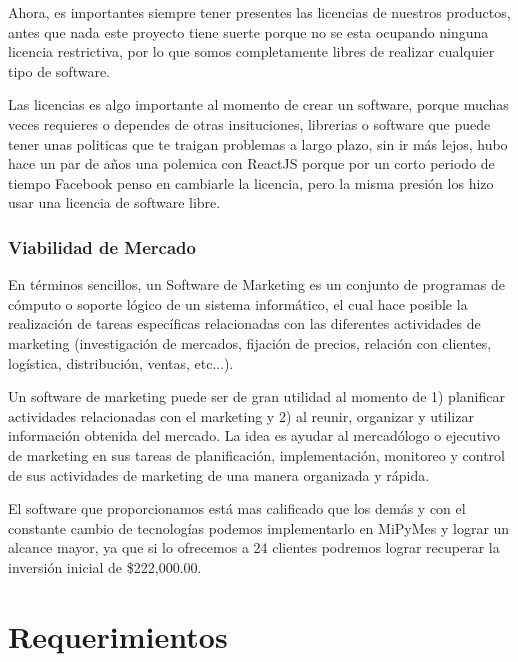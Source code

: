 \documentclass[12pt, fleqn]{report}                             %
\theoremstyle{break}                                            %
\begin{document}
        Ahora, es importantes siempre tener presentes las licencias de nuestros productos, antes que nada este 
        proyecto tiene suerte porque no se esta ocupando ninguna licencia restrictiva, por lo que somos
        completamente libres de realizar cualquier tipo de software.

        Las licencias es algo importante al momento de crear un software, porque muchas veces
        requieres o dependes de otras insituciones, librerias o software que puede tener unas politicas
        que te traigan problemas a largo plazo, sin ir más lejos, hubo hace un par de años una polemica con
        ReactJS porque por un corto periodo de tiempo Facebook penso en cambiarle la licencia, pero la misma
        presión los hizo usar una licencia de software libre.
    
    
    \vspace{1em}
    \subsection{Viabilidad de Mercado}

        En términos sencillos, un Software de Marketing es un conjunto de programas de cómputo o soporte lógico de un sistema informático, el cual hace posible la realización de tareas específicas relacionadas con las diferentes actividades de marketing (investigación de mercados, fijación de precios, relación con clientes, logística, distribución, ventas, etc...).

        Un software de marketing puede ser de gran utilidad al momento de 1) planificar actividades relacionadas con el marketing y 2) al reunir, organizar y utilizar información obtenida del mercado. La idea es ayudar al mercadólogo o ejecutivo de marketing en sus tareas de planificación, implementación, monitoreo y control de sus actividades de marketing de una manera organizada y rápida.
        
        
        El software que proporcionamos está mas calificado que los demás y con el constante cambio de tecnologías podemos implementarlo en MiPyMes y lograr un alcance mayor, ya que si lo ofrecemos a 24 clientes podremos lograr recuperar la inversión inicial de \$222,000.00.
        
        

    
    \chapter{Requerimientos}
\end{document}
